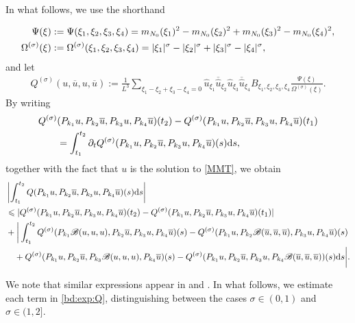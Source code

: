 \documentclass[UTF-8,reqno]{amsart}
\numberwithin{equation}{section}
\theoremstyle{definition}
\def\dif{{\mathord{{\rm d}}}}
\def\leq{\leqslant}
\def\dif{{\mathord{{\rm d}}}}
\def\leq{\leqslant}
\begin{document}
In what follows, we use the shorthand

\begin{align}
   \Psi(\xi)&:=  \Psi(\xi_1,\xi_2,\xi_3,\xi_4)=m_{N_0}(\xi_1)^2-m_{N_0}(\xi_2)^2+m_{N_0}(\xi_3)^2-m_{N_0}(\xi_4)^2,\notag\\
   \Omega^{(\sigma)}(\xi)&:= \Omega^{(\sigma)}(\xi_1,\xi_2,\xi_3,\xi_4)=|\xi_1|^\sigma-|\xi_2|^\sigma+|\xi_3|^\sigma-|\xi_4|^\sigma,\label{def:psiphi}
\end{align}
and let \begin{align*}
Q^{(\sigma)}(u,\overline u,u,\overline u):=\frac{1}{L^{3}}\sum_{\xi_1-\xi_2+\xi_3-\xi_4=0}\widehat{u}_{\xi_1}\overline{\widehat{u}}_{\xi_2}\widehat{u}_{\xi_3}\overline{\widehat{u}}_{\xi_4}B_{\xi_1,\xi_2,\xi_3,\xi_4}\frac{\Psi(\xi)}{\Omega^{(\sigma)}(\xi)}.
\end{align*}
By writing 
\begin{align*}
    Q^{(\sigma)}&(P_{k_1}u,P_{k_2}\overline u,P_{k_3}u,P_{k_4}\overline u)(t_2)- Q^{(\sigma)}(P_{k_1}u,P_{k_2}\overline u,P_{k_3}u,P_{k_4}\overline u)(t_1)\\
    &=\int_{t_1}^{t_2}\partial_tQ^{(\sigma)}(P_{k_1}u,P_{k_2}\overline u,P_{k_3}u,P_{k_4}\overline u)(s)\dif s,
\end{align*}
together with the fact that $u$  is the
solution to 
\eqref{MMT}, we obtain 
\begin{align}
& \left| \int_{t_1}^{t_2}Q (P_{k_1}u,P_{k_2}\overline u,P_{k_3}u,P_{k_4}\overline u)(s)\dif s\right|\notag\\
  &\leq | Q^{(\sigma)}(P_{k_1}u,P_{k_2}\overline u,P_{k_3}u,P_{k_4}\overline u)(t_2)- Q^{(\sigma)}(P_{k_1}u,P_{k_2}\overline u,P_{k_3}u,P_{k_4}\overline u)(t_1)|\notag\\
 &+  \bigg{|}\int_{t_1}^{t_2}Q^{(\sigma)}  (P_{k_1}\mathscr{B}(u,u,u),P_{k_2}\overline u,P_{k_3}u,P_{k_4}\overline u)(s)-Q^{(\sigma)}  (P_{k_1}u,P_{k_2}\mathscr{B}(\overline u,\overline u,\overline u),P_{k_3}u,P_{k_4}\overline u)(s)\notag\\
 &\quad +Q^{(\sigma)}  (P_{k_1} u,P_{k_2}\overline u,P_{k_3}\mathscr{B}(u,u,u),P_{k_4}\overline u)(s)-Q^{(\sigma)}  (P_{k_1} u ,P_{k_2}\overline u,P_{k_3}u,P_{k_4}\mathscr{B}(\overline u,\overline u,\overline u))(s)\dif s\bigg{|}.\label{bd:exp:Q}
\end{align}

We note that similar expressions appear in \cite[Section 5]{DIP25a} 
and \cite[Section 3.1]{MMT97}. 
In what follows, we estimate each term in \eqref{bd:exp:Q}, 
distinguishing between the cases $\sigma \in (0,1)$ and $\sigma \in (1,2]$. 
\end{document}
